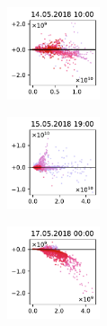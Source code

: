 \begin{figure}[H]
    \centering
    \begin{subfigure}
        \centering
        \includegraphics[width=0.30\textwidth,valign=t]{evaluation/figures/perturbations/perturbation-14.05.2018:10.00-monoterpenes-div-1.01.pdf}
    \end{subfigure}
    \begin{subfigure}
        \centering
        \includegraphics[width=0.30\textwidth,valign=t]{evaluation/figures/perturbations/perturbation-15.05.2018:19.00-monoterpenes-div-1.01.pdf}
    \end{subfigure}
    \begin{subfigure}
        \centering
        \includegraphics[width=0.30\textwidth,valign=t]{evaluation/figures/perturbations/perturbation-17.05.2018:00.00-monoterpenes-div-1.01.pdf}
    \end{subfigure}


\end{figure}
